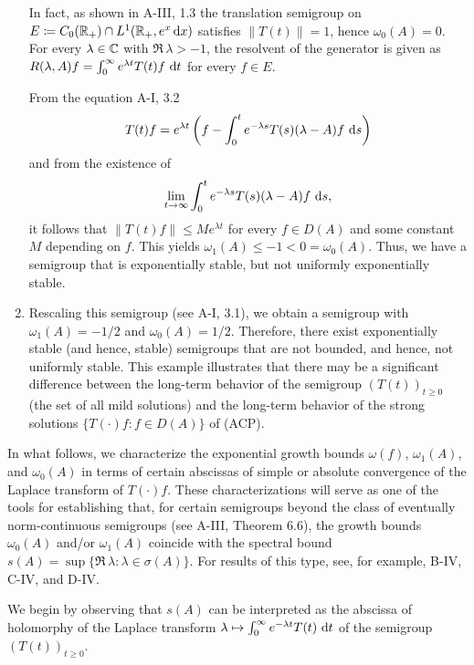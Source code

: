 \begin{example}
\begin{enumerate}[\upshape (i), wide, labelsep=1em]
In fact, as shown in A-III, 1.3 the translation semigroup on $E \coloneqq C_0(\mathbb{R}_{+}) \cap L^{1}(\mathbb{R}_{+},e^{x}\mathop{}\!\mathrm{d}{x})$ satisfies $\|T(t)\| = 1$, hence $\omega_{0}(A) = 0$. 
For every $\lambda \in \mathbb{C}$ with $\Re\,\lambda > -1$, the resolvent of the generator is given as $R(\lambda,A)f = \int_{0}^{\infty} e^{\lambda t} T(t)f \,\mathop{}\!\mathrm{d}{t}$ for every $f \in E$.

From the equation A-I, 3.2
\[
T(t)f = e^{\lambda t}\left(f - \int_{0}^{t} e^{-\lambda s} T(s) (\lambda - A)f \,\mathop{}\!\mathrm{d}{s}\right)
\]
and from the existence of 
\[
\lim_{t \to \infty} \int_{0}^{t} e^{-\lambda s} T(s) (\lambda - A)f \,\mathop{}\!\mathrm{d}{s},
\] 
it follows that 
$\|T(t)f\| \leq Me^{\lambda t}$ for every $f \in D(A)$ and some constant $M$ depending on $f$. This yields $\omega_{1}(A) \le -1 < 0 = \omega_{0}(A)$. 
Thus, we have a semigroup that is exponentially stable, but not uniformly exponentially stable.

\item
Rescaling this semigroup (see A-I, 3.1), we obtain a semigroup with $\omega_{1}(A) = -1/2 $ and 
$\omega_{0}(A) = 1/2 $.
Therefore, there exist exponentially stable (and hence, stable) semigroups that are not bounded, and hence, not uniformly stable.
This example illustrates that there may be a significant difference between the long-term behavior of the semigroup $(T(t))_{t \geq 0}$ (\ie the set of all mild solutions) and the long-term behavior of the strong solutions $\{T(\cdot)f \colon f \in D(A)\}$ of (ACP). 
\end{enumerate}
\end{example}
In what follows, we characterize the exponential growth bounds $\omega(f)$, $\omega_{1}(A)$, and $\omega_{0}(A)$ in terms of certain abscissas of simple or absolute convergence of the Laplace transform of $T(\cdot)f$. 
These characterizations will serve as one of the tools for 
establishing that, for certain semigroups beyond the class of eventually norm-continuous semigroups (see A-III, Theorem 6.6), the growth bounds $\omega_{0}(A)$ and/or $\omega_{1}(A)$ coincide with the spectral bound $s(A) = \sup\{\Re\,\lambda\colon\lambda \in \sigma(A)\}$. For results of this type, see, for example, B-IV, C-IV, and D-IV.

We begin by observing that $s(A)$ can be interpreted as the abscissa of holomorphy of the Laplace transform $\lambda \mapsto \int_{0}^{\infty} e^{-\lambda t} T(t) \,\mathop{}\!\mathrm{d}{t}$ of the semigroup $(T(t))_{t \geq 0}$.

